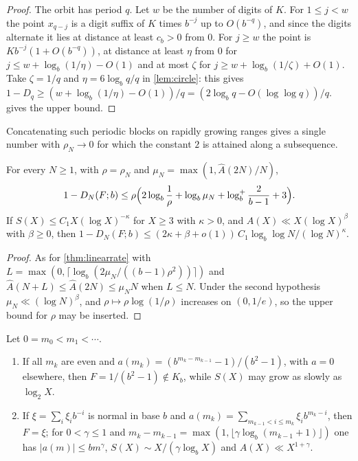 \documentclass[11pt]{article}
\newcommand{\Ahat}{\widehat A}
\begin{document}
\begin{proof}
The orbit has period $q$. Let $w$ be the number of digits of $K$. For $1\le j<w$ the point
$x_{q-j}$ is a digit suffix of $K$ times $b^{-j}$ up to $O(b^{-q})$, and since the digits
alternate it lies at distance at least $c_b>0$ from $0$. For $j\ge w$ the point is
$Kb^{-j}(1+O(b^{-q}))$, at distance at least $\eta$ from $0$ for
$j\le w+\log_b(1/\eta)-O(1)$ and at most $\zeta$ for $j\ge w+\log_b(1/\zeta)+O(1)$. Take
$\zeta=1/q$ and $\eta=6\log_bq/q$ in \cref{lem:circle}: this gives
$1-D_q\ge(w+\log_b(1/\eta)-O(1))/q=(2\log_bq-O(\log\log q))/q$.  gives
the upper bound.
\end{proof}

Concatenating such periodic blocks on rapidly growing ranges gives a single number with
$\rho_N\to0$ for which the constant $2$ is attained along a subsequence.

\begin{theorem}\label{thm:largermass}
For every $N\ge1$, with $\rho=\rho_N$ and $\mu_N=\max(1,\Ahat(2N)/N)$,
\[
1-D_N(F;b)\le\rho\Bigl(2\log_b\frac1\rho+\log_b\mu_N+\log_b^+\frac2{b-1}+3\Bigr).
\]
If $S(X)\le C_1X(\log X)^{-\kappa}$ for $X\ge3$ with $\kappa>0$, and
$A(X)\ll X(\log X)^{\beta}$ with $\beta\ge0$, then
$1-D_N(F;b)\le(2\kappa+\beta+o(1))\,C_1\log_b\log N/(\log N)^\kappa$.
\end{theorem}

\begin{proof}
As for \cref{thm:linearrate} with $L=\max(0,\lceil\log_b(2\mu_N/((b-1)\rho^2))\rceil)$ and
$\Ahat(N+L)\le\Ahat(2N)\le\mu_NN$ when $L\le N$. Under the second hypothesis
$\mu_N\ll(\log N)^\beta$, and $\rho\mapsto\rho\log(1/\rho)$ increases on $(0,1/e)$, so the
upper bound for $\rho$ may be inserted.
\end{proof}

\begin{proposition}\label{prop:counterexamples}
Let $0=m_0<m_1<\cdots$.
\begin{enumerate}[label=\textup{(\alph*)},nosep]
\item If all $m_k$ are even and $a(m_k)=(b^{m_k-m_{k-1}}-1)/(b^2-1)$, with $a=0$ elsewhere,
then $F=1/(b^2-1)\notin K_b$, while $S(X)$ may grow as slowly as $\log_2X$.
\item If $\xi=\sum_i\xi_ib^{-i}$ is normal in base $b$ and
$a(m_k)=\sum_{m_{k-1}<i\le m_k}\xi_ib^{m_k-i}$, then $F=\xi$; for $0<\gamma\le1$ and
$m_k-m_{k-1}=\max(1,\lfloor\gamma\log_b(m_{k-1}+1)\rfloor)$ one has $|a(m)|\le bm^{\gamma}$,
$S(X)\sim X/(\gamma\log_bX)$ and $A(X)\ll X^{1+\gamma}$.
\end{enumerate}
\end{proposition}
\end{document}
